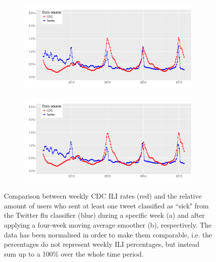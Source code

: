\documentclass[11pt, a4paper,twoside]{report}\usepackage[]{graphicx}\usepackage[]{color}
\begin{document}
\begin{figure}[H]
\centering
  \begin{subfigure}[t]{1\textwidth}
  \includegraphics[width=1\linewidth]{31_cdc_twitter_comp_nat_ma2_user.pdf}
  \caption{}
  \end{subfigure}
  
  \begin{subfigure}[t]{1\textwidth}
  \includegraphics[width=1\linewidth]{32_cdc_twitter_comp_nat_ma4_user.pdf}
  \caption{}
  \end{subfigure}
  \caption{Comparison between weekly CDC ILI rates (red) and the relative amount of users who sent at least one tweet classified as ``sick" from the Twitter flu classifier (blue) during a specific week (a) and after applying a four-week moving average smoother (b), respectively. The data has been normalised in order to make them comparable, i.e. the percentages do not represent weekly ILI percentages, but instead sum up to a 100\% over the whole time period.}
  \label{fig:cdc_tw_comp_nat_user}
\end{figure}
\end{document}
